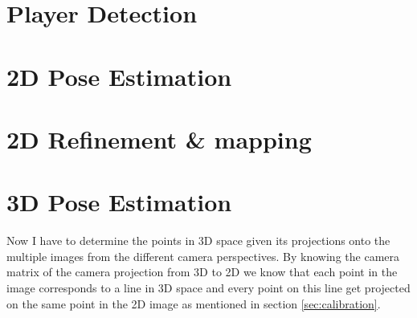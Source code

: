 \section{Player Detection}

\section{2D Pose Estimation}\label{sec:poseestimation}

\section{2D Refinement \& mapping}\label{sec:2drefinement}

\section{3D Pose Estimation}
Now I have to determine the points in 3D space given its projections onto the multiple images from the different camera perspectives. By knowing the camera matrix of the camera projection from 3D to 2D we know that each point in the image corresponds to a line in 3D space and every point on this line get projected on the same point in the 2D image as mentioned in section \ref{sec:calibration}.

